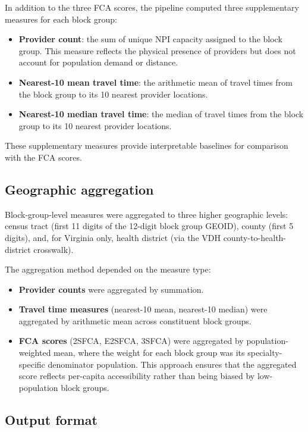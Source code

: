 \documentclass{CUP-JNL-DAP}%
\begin{document}
In addition to the three FCA scores, the pipeline computed three supplementary measures for each block group:

\begin{itemize}
\item \textbf{Provider count}: the sum of unique NPI capacity assigned to the block group. This measure reflects the physical presence of providers but does not account for population demand or distance.
\item \textbf{Nearest-10 mean travel time}: the arithmetic mean of travel times from the block group to its 10 nearest provider locations.
\item \textbf{Nearest-10 median travel time}: the median of travel times from the block group to its 10 nearest provider locations.
\end{itemize}

These supplementary measures provide interpretable baselines for comparison with the FCA scores.

\subsection{Geographic aggregation}

Block-group-level measures were aggregated to three higher geographic levels: census tract (first 11 digits of the 12-digit block group GEOID), county (first 5 digits), and, for Virginia only, health district (via the VDH county-to-health-district crosswalk).

The aggregation method depended on the measure type:

\begin{itemize}
\item \textbf{Provider counts} were aggregated by summation.
\item \textbf{Travel time measures} (nearest-10 mean, nearest-10 median) were aggregated by arithmetic mean across constituent block groups.
\item \textbf{FCA scores} (2SFCA, E2SFCA, 3SFCA) were aggregated by population-weighted mean, where the weight for each block group was its specialty-specific denominator population. This approach ensures that the aggregated score reflects per-capita accessibility rather than being biased by low-population block groups.
\end{itemize}

\subsection{Output format}
\end{document}
